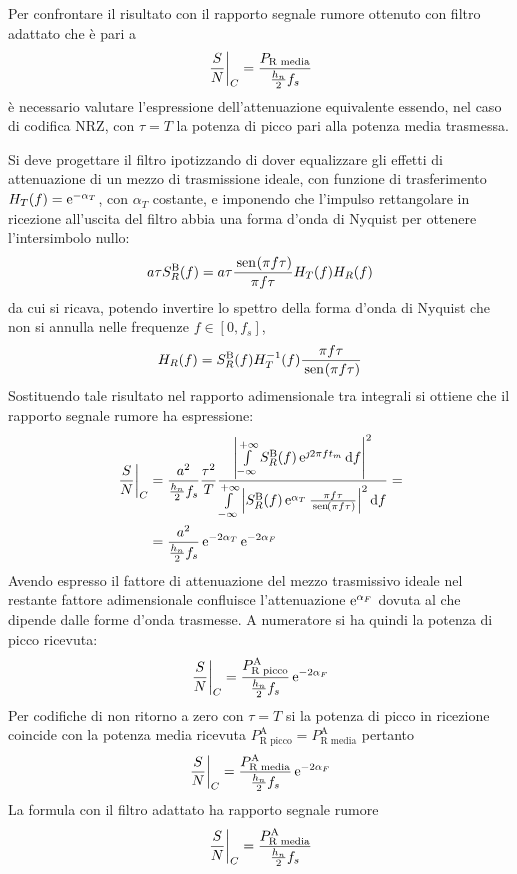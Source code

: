 Per confrontare il risultato con il rapporto segnale rumore ottenuto con filtro adattato che è pari a \[\left.{\frac{S}{N}}\right\rvert_{C}=\frac{P_\text{R media}}{\frac{h_n}{2}f_s}\]
è necessario valutare l'espressione dell'attenuazione equivalente essendo, nel caso di codifica \ac{NRZ}, con $\tau=T$ la potenza di picco pari alla potenza media trasmessa.

Si deve progettare il filtro ipotizzando di dover equalizzare gli effetti di attenuazione di un mezzo di trasmissione ideale, con funzione di trasferimento $H_T(f)=\operatorname{e}^{-\alpha_T}$, con $\alpha_T$ costante, e imponendo che l'impulso rettangolare in ricezione all'uscita del filtro abbia una forma d'onda di Nyquist per ottenere l'intersimbolo nullo:
\begin{equation}
a\tau S_R^\text{B}(f)=a\tau\frac{\,{\operatorname{sen}}^{}\!\left({\pi f\tau}\right)}{\pi f\tau} H_T(f) H_R(f)
\end{equation}
da cui si ricava, potendo invertire lo spettro della forma d'onda di Nyquist che non si annulla nelle frequenze $f\in[0,f_s]$,
\begin{equation}
H_R(f)=S_R^\text{B}(f) H_T^{-1}(f) \frac{\pi f\tau}{\,{\operatorname{sen}}^{}\!\left({\pi f\tau}\right)}
\end{equation}
Sostituendo tale risultato nel rapporto adimensionale tra integrali si ottiene che il rapporto segnale rumore ha espressione:
\begin{equation}
\begin{split}
\left.{\frac{S}{N}}\right\rvert_{C}&=\frac{a^2}{\frac{h_n}{2}f_s} \frac{\tau^2}{T}\frac{\left|{\int\limits_{-\infty}^{+\infty}{S_R^\text{B}(f)\operatorname{e}^{\jmath 2\pi f t_m}}{\,\mathop{}\!\mathrm{d}{f}}}\right|^2}{\int\limits_{-\infty}^{+\infty}{\left|{S_R^\text{B}(f) \operatorname{e}^{\alpha_T}\frac{\pi f\tau}{\,{\operatorname{sen}}^{}\!\left({\pi f\tau}\right)}}\right|^2}{\,\mathop{}\!\mathrm{d}{f}}}=\\
&=\frac{a^2}{\frac{h_n}{2}f_s}\operatorname{e}^{-2\alpha_T}\operatorname{e}^{-2\alpha_F}
\end{split}
\end{equation}
Avendo espresso il fattore di attenuazione del mezzo trasmissivo ideale nel restante fattore adimensionale confluisce l'attenuazione $\operatorname{e}^{\alpha_F}$ dovuta al  che dipende dalle forme d'onda trasmesse. A numeratore si ha quindi la potenza di picco ricevuta:
\begin{equation}
\left.{\frac{S}{N}}\right\rvert_{C}=\frac{P_\text{R picco}^\text{A}}{\frac{h_n}{2}f_s}\operatorname{e}^{-2\alpha_F}
\end{equation}
Per codifiche di non ritorno a zero con $\tau=T$ si la potenza di picco in ricezione coincide con la potenza media ricevuta $P_\text{R picco}^\text{A}=P_\text{R media}^\text{A}$ pertanto
\begin{equation}
\left.{\frac{S}{N}}\right\rvert_{C}=\frac{P_\text{R media}^\text{A}}{\frac{h_n}{2}f_s}\operatorname{e}^{-2\alpha_F}
\end{equation}
La formula con il filtro adattato ha rapporto segnale rumore
\begin{equation}
\left.{\frac{S}{N}}\right\rvert_{C}=\frac{P_\text{R media}^\text{A}}{\frac{h_n}{2}f_s}
\end{equation}

